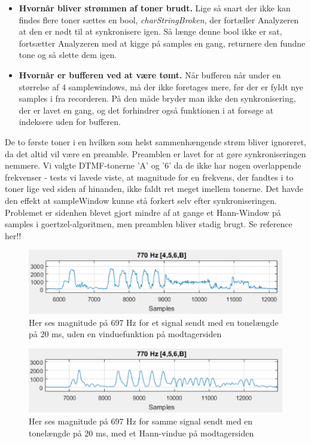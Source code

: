 \begin{itemize}

\item \textbf{Hvornår bliver strømmen af toner brudt.} Lige så snart der ikke kan findes flere toner sættes en bool, \textit{charStringBroken}, der fortæller Analyzeren at den er nødt til at synkronisere igen. Så længe denne bool ikke er sat, fortsætter Analyzeren med at kigge på samples en gang, returnere den fundne tone og så slette dem igen. 
\item \textbf{Hvornår er bufferen ved at være tømt.} Når bufferen når under en størrelse af 4 samplewindows, må der ikke foretages mere, før der er fyldt nye samples i fra recorderen. På den måde bryder man ikke den synkronisering, der er lavet en gang, og det forhindrer også funktionen i at forsøge at indeksere uden for bufferen.
\end{itemize}

De to første toner i en hvilken som helst sammenhængende strøm bliver ignoreret, da det altid vil være en preamble. Preamblen er lavet for at gøre synkroniseringen nemmere. Vi valgte DTMF-tonerne 'A' og '6' da de ikke har nogen overlappende frekvenser - tests vi lavede viste, at magnitude for en frekvens, der fandtes i to toner lige ved siden af hinanden, ikke faldt ret meget imellem tonerne. Det havde den effekt at sampleWindow kunne stå forkert selv efter synkroniseringen. Problemet er sidenhen blevet gjort mindre af at gange et Hann-Window på samples i goertzel-algoritmen, men preamblen bliver stadig brugt. Se reference her!!

\begin{figure}[h]
\centering
\includegraphics[scale=0.8]{Billeder/NoWindow.PNG}
\caption{Her ses magnitude på 697 Hz for et signal sendt med en tonelængde på 20 ms, uden en vinduefunktion på modtagersiden}
\label{fig:NoWindow}
\end{figure}

\begin{figure}[h]
\centering
\includegraphics[scale=0.8]{Billeder/HannWindow.PNG}
\caption{Her ses magnitude på 697 Hz for samme signal sendt med en tonelængde på 20 ms, med et Hann-vindue på modtagersiden}
\label{fig:NoWindow}
\end{figure}


